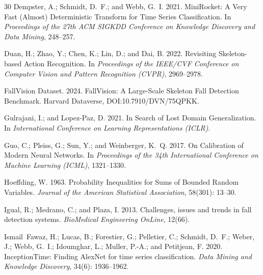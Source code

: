 \begin{thebibliography}{30}
Dempster, A.; Schmidt, D.~F.; and Webb, G.~I. 2021.
\newblock MiniRocket: A Very Fast (Almost) Deterministic Transform for Time Series Classification.
\newblock In \emph{Proceedings of the 27th ACM SIGKDD Conference on Knowledge Discovery and Data Mining}, 248--257.

Duan, H.; Zhao, Y.; Chen, K.; Lin, D.; and Dai, B. 2022.
\newblock Revisiting Skeleton-based Action Recognition.
\newblock In \emph{Proceedings of the IEEE/CVF Conference on Computer Vision and Pattern Recognition (CVPR)}, 2969--2978.

FallVision Dataset. 2024.
\newblock FallVision: A Large-Scale Skeleton Fall Detection Benchmark.
\newblock Harvard Dataverse, DOI:10.7910/DVN/75QPKK.

Gulrajani, I.; and Lopez-Paz, D. 2021.
\newblock In Search of Lost Domain Generalization.
\newblock In \emph{International Conference on Learning Representations (ICLR)}.

Guo, C.; Pleiss, G.; Sun, Y.; and Weinberger, K.~Q. 2017.
\newblock On Calibration of Modern Neural Networks.
\newblock In \emph{Proceedings of the 34th International Conference on Machine Learning (ICML)}, 1321--1330.

Hoeffding, W. 1963.
\newblock Probability Inequalities for Sums of Bounded Random Variables.
\newblock \emph{Journal of the American Statistical Association}, 58(301): 13--30.

Igual, R.; Medrano, C.; and Plaza, I. 2013.
\newblock Challenges, issues and trends in fall detection systems.
\newblock \emph{BioMedical Engineering OnLine}, 12(66).

Ismail~Fawaz, H.; Lucas, B.; Forestier, G.; Pelletier, C.; Schmidt, D.~F.; Weber, J.; Webb, G.~I.; Idoumghar, L.; Muller, P.-A.; and Petitjean, F. 2020.
\newblock InceptionTime: Finding AlexNet for time series classification.
\newblock \emph{Data Mining and Knowledge Discovery}, 34(6): 1936--1962.


\end{thebibliography}
